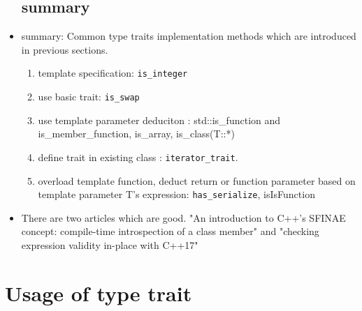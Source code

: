 \documentclass[a4paper,11pt,twoside]{book}
\begin{document}
\begin{itemize}
\begin{itemize}
\end{itemize}



\subsection{summary}
	
	\item summary: Common type traits implementation methods which are introduced in previous sections. 
	\begin{enumerate}
		\item template specification: \texttt{is\_integer}
		\item use basic trait: \texttt{is\_swap}
		\item use template parameter deduciton : std::is\_function and
		is\_member\_function, is\_array, is\_class(T::*)
		\item define trait in existing class : \texttt{iterator\_trait}.
		\item overload template function, deduct return or function parameter based on template parameter T's expression:  \texttt{has\_serialize}, isIsFunction
	\end{enumerate}

	\item There are two articles which are good.
"An introduction to C++'s SFINAE concept: compile-time introspection of a class member" and "checking expression validity in-place with C++17"
\end{itemize}




\section{Usage of type trait}
\end{document}
